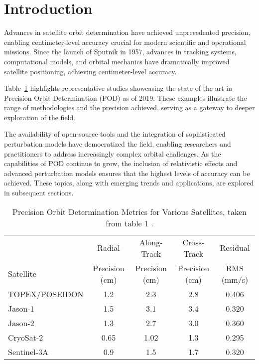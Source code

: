 % 

\section{Introduction}
Advances in satellite orbit determination have achieved unprecedented precision, enabling centimeter-level accuracy crucial for modern scientific and operational missions. Since the launch of Sputnik in 1957, advances in tracking systems, computational models, and orbital mechanics have dramatically improved satellite positioning, achieving centimeter-level accuracy.

Table~\ref{tab:precision-limits} highlights representative studies showcasing the state of the art in Precision Orbit Determination (POD) as of 2019. These examples illustrate the range of methodologies and the precision achieved, serving as a gateway to deeper exploration of the field.

The availability of open-source tools and the integration of sophisticated perturbation models have democratized the field, enabling researchers and practitioners to address increasingly complex orbital challenges. As the capabilities of POD continue to grow, the inclusion of relativistic effects and advanced perturbation models ensures that the highest levels of accuracy can be achieved. These topics, along with emerging trends and applications, are explored in subsequent sections. 

\begin{table}[h!]
\centering
\begin{tabular}{lcccc}
 & Radial & Along-Track & Cross-Track & Residual \\
Satellite & Precision (cm) & Precision (cm) & Precision  (cm) &  RMS (mm/s) \\
\hline
TOPEX/POSEIDON & 1.2 & 2.3 & 2.8 & 0.406 \\
Jason-1        & 1.5 & 3.1 & 3.4 & 0.320 \\
Jason-2        & 1.3 & 2.7 & 3.0 & 0.360 \\
CryoSat-2      & 0.65 & 1.02 & 1.3 & 0.295 \\
Sentinel-3A    & 0.9 & 1.5 & 1.7 & 0.320 \\
\hline
\end{tabular}
\caption{Precision Orbit Determination Metrics for Various Satellites, taken from table 1 \cite{gaur2019precision}.}
\label{tab:precision-limits}
\end{table}



\endinput  %

